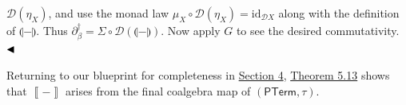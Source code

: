 \documentclass[11pt,a4paper]{amsart}
\begin{document}
\hypertarget{html:S5.SS0.SSS0.Px2.SPx1.p5.m3}{}\({{\mathcal{D}}(\eta_{X})}\), and use the monad law %
\hypertarget{html:S5.SS0.SSS0.Px2.SPx1.p5.m4}{}\({\mu_{X}\circ{\mathcal{D}}(\eta_{X})=\mathrm{id}_{{\mathcal{D}}X}}\) along with the definition of %
\hypertarget{html:S5.SS0.SSS0.Px2.SPx1.p5.m5}{}\({\llparenthesis{-}\rrparenthesis}\). Thus %
\hypertarget{html:S5.SS0.SSS0.Px2.SPx1.p5.m6}{}\({\partial_{\beta}^{\dagger}=\Sigma\circ{\mathcal{D}}(\llparenthesis{-}\rrparenthesis)}\). Now apply %
\hypertarget{html:S5.SS0.SSS0.Px2.SPx1.p5.m7}{}\({G}\) to see the desired commutativity. %
\hypertarget{html:S5.SS0.SSS0.Px2.SPx1.p5.m8}{}\({\hfill\blacktriangleleft}\)
\par\medskip
\hypertarget{html:S5.SS0.SSS0.Px2.SPx1.p6}{} Returning to our blueprint for completeness in \hyperlink{html:S4}{Section 4}, \hyperlink{html:S5.Thmtheorem13}{Theorem 5.13} shows that %
\hypertarget{html:S5.SS0.SSS0.Px2.SPx1.p6.m1}{}\({\left\llbracket{-}\right\rrbracket}\) arises from the final coalgebra map of %
\hypertarget{html:S5.SS0.SSS0.Px2.SPx1.p6.m2}{}\({(\mathsf{PTerm},\tau)}\).
\par\medskip
    
\end{document}
